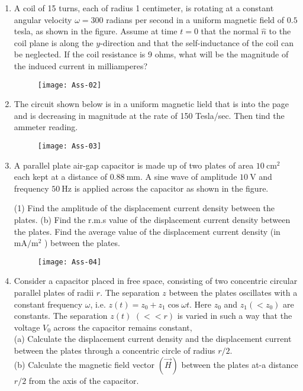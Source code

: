 \begin{enumerate}
\begin{figure}[H]
	\end{figure}
	Find an expression for the $x$-component of the force $\vec{F}$ acting on the loop in terms of its velocity $\vec{v}(t), B, L$ and $R$.
	\item A coil of 15 turns, each of radius 1 centimeter, is rotating at a constant angular velocity $\omega=300$ radians per second in a uniform magnetic field of $0.5$ tesla, as shown in the figure. Assume at time $t=0$ that the normal $\hat{n}$ to the coil plane is along the $y$-direction and that the self-inductance of the coil can be neglected. If the coil resistance is 9 ohms, what will be the magnitude of the induced current in milliamperes?
	\begin{figure}[H]
		\centering
		\texttt{[image: Ass-02]}
	\end{figure}
	\item The circuit shown below is in a uniform magnetic lield that is into the page and is decreasing in magnitude at the rate of 150 Tesla/sec. Then tind the ammeter reading.
	\begin{figure}[H]
		\centering
		\texttt{[image: Ass-03]}
	\end{figure}
	\item A parallel plate air-gap capacitor is made up of two plates of area $10 \mathrm{~cm}^{2}$ each kept at a distance of $0.88 \mathrm{~mm}$. A sine wave of amplitude $10 \mathrm{~V}$ and frequency $50 \mathrm{~Hz}$ is applied across the capacitor as shown in the figure.
	\begin{tasks}(1)
		\task[\textbf{a.}]Find the amplitude of the displacement current density between the plates.
		\task[\textbf{b.}]
		(b) Find the r.m.s value of the displacement current density between the plates.
		\task[\textbf{c.}]Find the average value of the displacement current density (in $\mathrm{mA} / \mathrm{m}^{2}$ ) between the plates.
	\end{tasks}
	\begin{figure}[H]
		\centering
		\texttt{[image: Ass-04]}
	\end{figure}
	\item Consider a capacitor placed in free space, consisting of two concentric circular parallel plates of radii $r$. The separation $z$ between the plates oscillates with a constant frequency $\omega$, i.e. $z(t)=z_{0}+z_{1} \cos \omega t$. Here $z_{0}$ and $z_{1}\left(<z_{0}\right)$ are constants. The separation $z(t)$ $(<<r)$ is varied in such a way that the voltage $V_{0}$ across the capacitor remains constant,\\
	(a) Calculate the displacement current density and the displacement current between the plates through a concentric circle of radius $r / 2$.\\
	(b) Calculate the magnetic field vector $(\vec{H})$ between the plates at-a distance $r / 2$ from the axis of the capacitor.
\end{enumerate}

